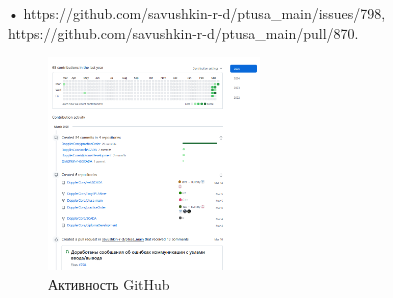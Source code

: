{  \par \redline • https://github.com/savushkin-r-d/ptusa\_main/issues/798, https://github.com/savushkin-r-d/ptusa\_main/pull/870.
 
  \begin{figure}[h]
 
    \centering
 
    \includegraphics[width=0.5\textwidth]{img/activity.png}
 
    \caption{Активность GitHub}
 
  \end{figure}
\par }